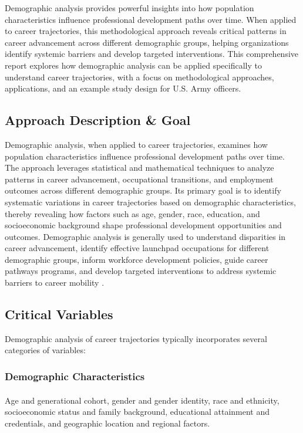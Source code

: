 \documentclass[../main.tex]{subfiles}
\begin{document}
Demographic analysis provides powerful insights into how population characteristics influence professional development paths over time. When applied to career trajectories, this methodological approach reveals critical patterns in career advancement across different demographic groups, helping organizations identify systemic barriers and develop targeted interventions. This comprehensive report explores how demographic analysis can be applied specifically to understand career trajectories, with a focus on methodological approaches, applications, and an example study design for U.S. Army officers.

\subsection{Approach Description \& Goal}

Demographic analysis, when applied to career trajectories, examines how population characteristics influence professional development paths over time. The approach leverages statistical and mathematical techniques to analyze patterns in career advancement, occupational transitions, and employment outcomes across different demographic groups. Its primary goal is to identify systematic variations in career trajectories based on demographic characteristics, thereby revealing how factors such as age, gender, race, education, and socioeconomic background shape professional development opportunities and outcomes. Demographic analysis is generally used to understand disparities in career advancement, identify effective launchpad occupations for different demographic groups, inform workforce development policies, guide career pathways programs, and develop targeted interventions to address systemic barriers to career mobility \citep{dol2023building, nataraj2018career}.

\subsection{Critical Variables}

Demographic analysis of career trajectories typically incorporates several categories of variables:

\subsubsection{Demographic Characteristics}
\paragraph{} Age and generational cohort, gender and gender identity, race and ethnicity, socioeconomic status and family background, educational attainment and credentials, and geographic location and regional factors.
\end{document}
